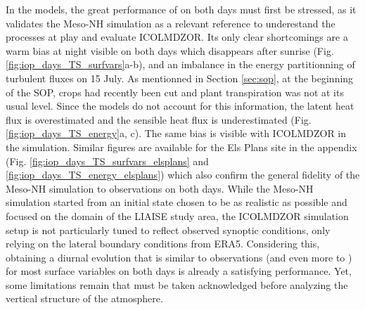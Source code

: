 In the models, the great performance of \mesoexact on both days must first be stressed, as it validates the Meso-NH simulation as a relevant reference to underestand the processes at play and evaluate ICOLMDZOR. 
Its only clear shortcomings are a warm bias at night visible on both days which disappears after sunrise (Fig. \ref{fig:iop_days_TS_surfvars}a-b), and an imbalance in the energy partitionning of turbulent fluxes on 15 July.
As mentionned in Section \ref{sec:sop}, at the beginning of the SOP, crops had recently been cut and plant transpiration was not at its usual level.
Since the models do not account for this information, the latent heat flux is overestimated and the sensible heat flux is underestimated (Fig. \ref{fig:iop_days_TS_energy}a, c). The same bias is visible with ICOLMDZOR in the \irrboost simulation. 
Similar figures are available for the Els Plans site in the appendix (Fig. \ref{fig:iop_days_TS_surfvars_elsplans} and \ref{fig:iop_days_TS_energy_elsplans}) which also confirm the general fidelity of the Meso-NH simulation to observations on both days.
While the Meso-NH simulation started from an initial state chosen to be as realistic as possible and focused on the domain of the LIAISE study area, the ICOLMDZOR simulation setup is not particularly tuned to reflect observed synoptic conditions, only relying on the lateral boundary conditions from ERA5. Considering this, obtaining a diurnal evolution that is similar to observations (and even more to \mesomean) for most surface variables on both days is already a satisfying performance. Yet, some limitations remain that must be taken acknowledged before analyzing the vertical structure of the atmosphere.

